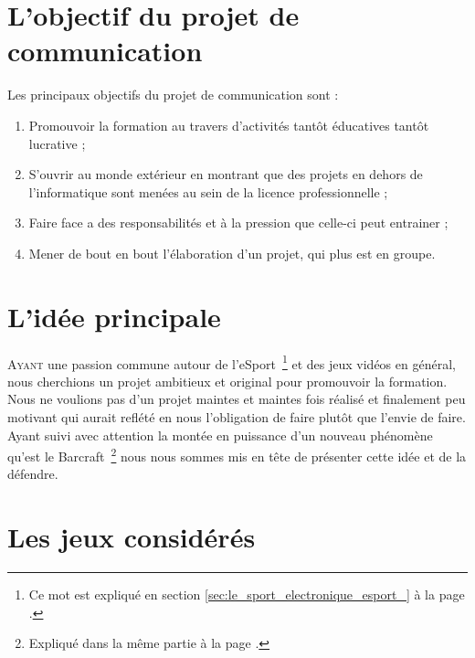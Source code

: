 \section{L'objectif du projet de communication}%
\label{sec:l_objectif_du_projet_de_communication}

Les principaux objectifs du projet de communication sont :

\begin{enumerate}

\item Promouvoir la formation au travers d'activités tantôt éducatives
tantôt lucrative ;

\item S'ouvrir au monde extérieur en montrant que des projets en dehors
de l'informatique sont menées au sein de la licence professionnelle ;

\item Faire face a des responsabilités et à la pression que celle-ci
peut entrainer ;

\item Mener de bout en bout l'élaboration d'un projet, qui plus est en
groupe.

\end{enumerate}

\section{L'idée principale}
\label{sec:l_idee_principale}

\lettrine{A}{yant} une passion commune autour de l'eSport\, \footnote{Ce
mot est expliqué en section \ref{sec:le_sport_electronique_esport_} à la
page \pageref{sec:le_sport_electronique_esport_}.} et des jeux vidéos en
général, nous cherchions un projet ambitieux et original pour promouvoir
la formation. Nous ne voulions pas d'un projet maintes et maintes fois
réalisé et finalement peu motivant qui aurait reflété en nous
l'obligation de faire plutôt que l'envie de faire. Ayant suivi avec
attention la montée en puissance d'un nouveau phénomène qu'est le
Barcraft\, \footnote{Expliqué dans la même partie à la page
\pageref{sec:barcraft}.} nous nous sommes mis en tête de présenter cette
idée et de la défendre.

\section{Les jeux considérés}%
\label{sec:les_jeux_consideres}

